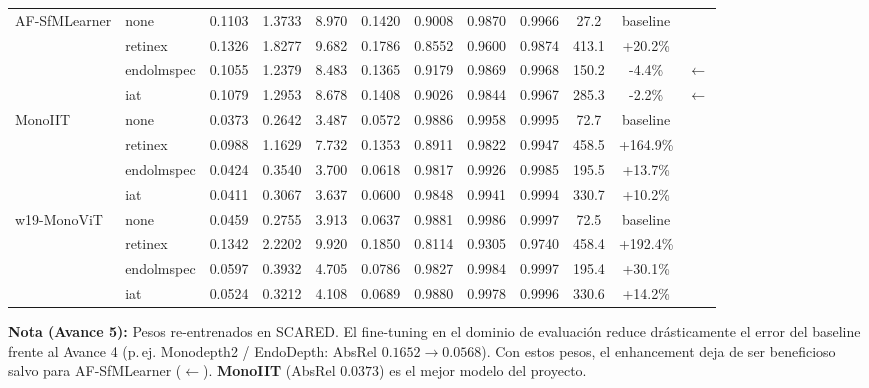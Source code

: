 \documentclass{article}
\begin{document}
\begin{table}[htbp]
\begin{tabular}{llccccccccc@{\hspace{12pt}}l}
AF-SfMLearner & none       & 0.1103 & 1.3733 & 8.970 & 0.1420 & 0.9008 & 0.9870 & 0.9966 &  27.2 & baseline  & \\
              & retinex    & 0.1326 & 1.8277 & 9.682 & 0.1786 & 0.8552 & 0.9600 & 0.9874 & 413.1 & +20.2\%   & \\
              & endolmspec & 0.1055 & 1.2379 & 8.483 & 0.1365 & 0.9179 & 0.9869 & 0.9968 & 150.2 &  -4.4\%   & $\leftarrow$ \\
              & iat        & 0.1079 & 1.2953 & 8.678 & 0.1408 & 0.9026 & 0.9844 & 0.9967 & 285.3 &  -2.2\%   & $\leftarrow$ \\
\addlinespace[0.8em]

MonoIIT & none       & 0.0373 & 0.2642 & 3.487 & 0.0572 & 0.9886 & 0.9958 & 0.9995 &  72.7 & baseline  & \\
        & retinex    & 0.0988 & 1.1629 & 7.732 & 0.1353 & 0.8911 & 0.9822 & 0.9947 & 458.5 & +164.9\%  & \\
        & endolmspec & 0.0424 & 0.3540 & 3.700 & 0.0618 & 0.9817 & 0.9926 & 0.9985 & 195.5 & +13.7\%   & \\
        & iat        & 0.0411 & 0.3067 & 3.637 & 0.0600 & 0.9848 & 0.9941 & 0.9994 & 330.7 & +10.2\%   & \\
\addlinespace[0.8em]

w19-MonoViT & none       & 0.0459 & 0.2755 & 3.913 & 0.0637 & 0.9881 & 0.9986 & 0.9997 &  72.5 & baseline  & \\
            & retinex    & 0.1342 & 2.2202 & 9.920 & 0.1850 & 0.8114 & 0.9305 & 0.9740 & 458.4 & +192.4\%  & \\
            & endolmspec & 0.0597 & 0.3932 & 4.705 & 0.0786 & 0.9827 & 0.9984 & 0.9997 & 195.4 & +30.1\%   & \\
            & iat        & 0.0524 & 0.3212 & 4.108 & 0.0689 & 0.9880 & 0.9978 & 0.9996 & 330.6 & +14.2\%   & \\
\bottomrule
\end{tabular}

\vspace{0.5em}
\begin{minipage}{\linewidth}
    \footnotesize
    \textbf{Nota (Avance 5):} Pesos re-entrenados en SCARED. El fine-tuning en el dominio de evaluación reduce drásticamente el error del baseline frente al Avance 4 (p.\,ej. Monodepth2 / EndoDepth: AbsRel $0.1652 \to 0.0568$). Con estos pesos, el enhancement deja de ser beneficioso salvo para AF-SfMLearner ($\leftarrow$). \textbf{MonoIIT} (AbsRel $0.0373$) es el mejor modelo del proyecto.
\end{minipage}

\end{table}
\end{document}
